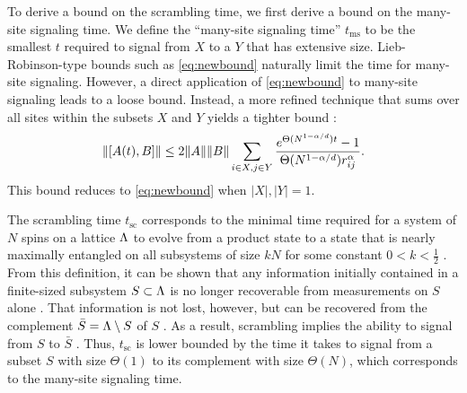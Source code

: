To derive a bound on the scrambling time, we first derive a bound on the many-site signaling time. We define the ``many-site signaling time'' $t_\text{ms}$ to be the smallest $t$ required to signal from $X$ to a $Y$ that has extensive size.
Lieb-Robinson-type bounds such as \cref{eq:newbound} naturally limit the time for many-site signaling. However, a direct application of \cref{eq:newbound} to many-site signaling leads to a loose bound. Instead, a more refined technique that sums over all sites within the subsets $X$ and $Y$ yields a tighter bound \cite{Gong2017}:
\begin{equation}
\label{refinedbound}
    \|[A(t),B]\|\le  2\|A\|\|B\|\sum_{i\in X, j\in Y}\frac{e^{\Theta(N^{1-\alpha/d})t}-1}{\Theta(N^{1-\alpha/d})r_{ij}^{\alpha}}.
\end{equation}
This bound reduces to \cref{eq:newbound} when $|X|,|Y|=1$.

The scrambling time $t_\text{sc}$  corresponds to the minimal time required for a system of $N$ spins on a lattice $\Lambda$ to evolve from a product state to a state that is nearly maximally entangled on all subsystems of size $kN$ for some constant $0<k<\frac12$ \cite{Lashkari2013}.
From this definition, it can be shown that any information initially contained in a finite-sized subsystem $S \subset \Lambda$ is no longer recoverable from measurements on $S$ alone \cite{Lashkari2013}.
That information is not lost, however, but can be recovered from the complement $\bar{S} = \Lambda \setminus S$ of $S$ \cite{Hayden07,Cotler18}.
As a result, scrambling implies the ability to signal from $S$ to $\bar{S}$ \cite{Lashkari2013}.
Thus, $t_\text{sc}$ is lower bounded by the time it takes to signal from a subset $S$ with size $\Theta(1)$ to its complement with size $\Theta(N)$, which corresponds to the many-site signaling time.

